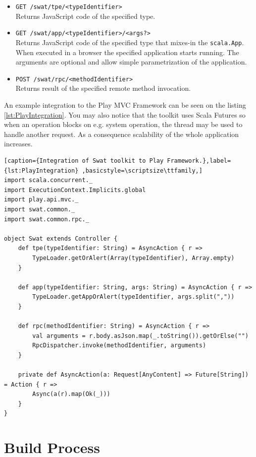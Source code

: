 \documentclass[12pt,a4paper]{report}
\begin{document}
\begin{itemize}
\item \texttt{GET /swat/tpe/<typeIdentifier>}\\
Returns JavaScript code of the specified type.
\item \texttt{GET /swat/app/<typeIdentifier>/<args?>}\\
Returns JavaScript code of the specified type that mixes-in the \texttt{scala.App}. When executed in a browser the specified application starts running. The arguments are optional and allow simple parametrization of the application.
\item \texttt{POST /swat/rpc/<methodIdentifier>}\\
Returns result of the specified remote method invocation.  
\end{itemize}

An example integration to the Play MVC Framework \cite{Play} can be seen on the listing \ref{lst:PlayIntegration}. You may also notice that the toolkit uses Scala Futures \cite{ScalaFutures} so when an operation blocks on e.g. system operation, the thread may be used to handle another request. As a consequence scalability of the whole application increases.

\begin{lstlisting}[caption={Integration of Swat toolkit to Play Framework.},label={lst:PlayIntegration}	,basicstyle=\scriptsize\ttfamily,]
import scala.concurrent._
import ExecutionContext.Implicits.global
import play.api.mvc._
import swat.common._
import swat.common.rpc._

object Swat extends Controller {
    def tpe(typeIdentifier: String) = AsyncAction { r =>
        TypeLoader.getOrAlert(Array(typeIdentifier), Array.empty)
    }

    def app(typeIdentifier: String, args: String) = AsyncAction { r =>
        TypeLoader.getAppOrAlert(typeIdentifier, args.split(","))
    }

    def rpc(methodIdentifier: String) = AsyncAction { r =>
        val arguments = r.body.asJson.map(_.toString()).getOrElse("")
        RpcDispatcher.invoke(methodIdentifier, arguments)
    }

    private def AsyncAction(a: Request[AnyContent] => Future[String]) = Action { r =>
        Async(a(r).map(Ok(_)))
    }
}
\end{lstlisting}

\section{Build Process}
\end{document}
